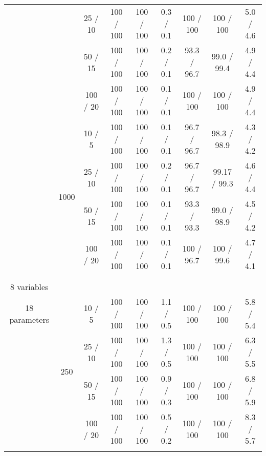 \documentclass[twoside,11pt]{article}
\begin{document}
\begin{table}[H]
\begin{tabular}{  c | c | c || c | c | c || c | c | c }
& & 25 / 10  & 100 / 100 & 100 / 100  & 0.3 / 0.1 & 100 / 100 & 100 / 100 & 5.0 / 4.6 \\
	
& & 50 / 15 & 100 / 100 & 100 / 100 & 0.2 / 0.1 & \cellcolor{yellow!100} 93.3 / 96.7 & \cellcolor{yellow!100} 99.0 / 99.4 & 4.9 / 4.4 \\

& & 100 / 20 & 100 / 100 & 100 / 100 &  0.1 / 0.1 & 100 / 100 & 100 / 100 & 4.9 / 4.4 \\

\hhline {~|-|-||-|-|-||-|-|-}

& \multirow{4}{*}{1000}

& 10 / 5 & 100 / 100 & 100 / 100 & 0.1 / 0.1 & \cellcolor{yellow!100} 96.7 / 96.7 & \cellcolor{yellow!100} 98.3 / 98.9 & 4.3 / 4.2 \\

& & 25 / 10  & 100 / 100 & 100 / 100 & 0.2 / 0.1 & \cellcolor{yellow!100} 96.7 / 96.7 & \cellcolor{yellow!100} 99.17 / 99.3 & 4.6 / 4.4 \\
	
& & 50 / 15 & 100 / 100 & 100 / 100 & 0.1 / 0.1 & \cellcolor{yellow!100} 93.3 / 93.3 & \cellcolor{yellow!100} 99.0 / 98.9 & 4.5 / 4.2 \\

& & 100 / 20 & 100 / 100 & 100 / 100 & 0.1 / 0.1 & \cellcolor{yellow!100} 100 / 96.7 & \cellcolor{yellow!100} 100 / 99.6 & 4.7 / 4.1 \\

\hhline {=|=|=||=|=|=||=|=|=}

\multirow{8}{*}{\thead{\textbf{asia} \\ \\ 8 variables \\ 18 parameters}} & \multirow{4}{*}{250} 

& 10 / 5  & 100 / 100 & 100 / 100 & 1.1 / 0.5 & 100 / 100 & 100 / 100 & 5.8 / 5.4 \\

& & 25 / 10 & 100 / 100 & 100 / 100 & 1.3 / 0.5  & 100 / 100 & 100 / 100 & 6.3 / 5.5 \\
	
& & 50 / 15 & 100 / 100 & 100 / 100 & 0.9 / 0.3 & 100 / 100 & 100 / 100 & 6.8 / 5.9 \\

& & 100 / 20 & 100 / 100 & 100 / 100  & 0.5 / 0.2 & 100 / 100 & 100 / 100 & 8.3 / 5.7 \\

\hhline {~|-|-||-|-|-||-|-|-}


\end{tabular}
\end{table}
\end{document}
